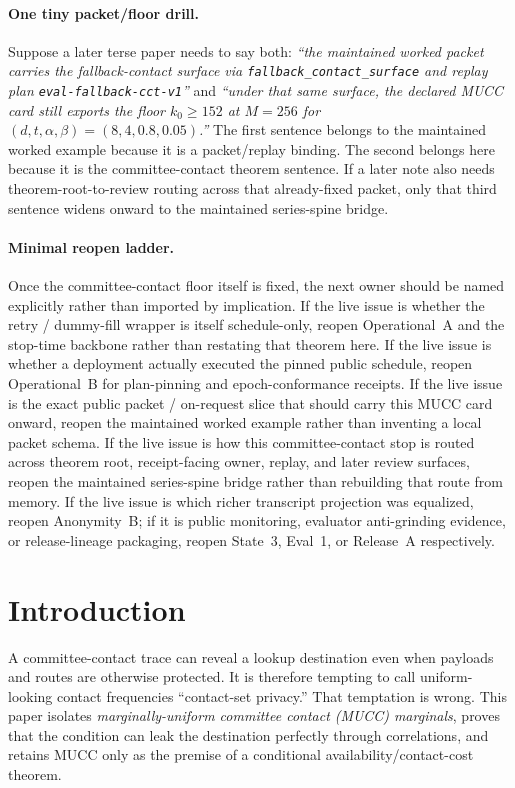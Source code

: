 \documentclass[11pt]{article}
\begin{document}
\paragraph{One tiny packet/floor drill.}
Suppose a later terse paper needs to say both: \emph{``the maintained worked packet carries the fallback-contact surface via \texttt{fallback\_contact\_surface} and replay plan \texttt{eval-fallback-cct-v1}''} and \emph{``under that same surface, the declared MUCC card still exports the floor $k_0\ge 152$ at $M=256$ for $(d,t,\alpha,\beta)=(8,4,0.8,0.05)$.''} The first sentence belongs to the maintained worked example because it is a packet/replay binding. The second belongs here because it is the committee-contact theorem sentence. If a later note also needs theorem-root-to-review routing across that already-fixed packet, only that third sentence widens onward to the maintained series-spine bridge.\cite{series:workedexample,series:seriesspines}

\paragraph{Minimal reopen ladder.}
Once the committee-contact floor itself is fixed, the next owner should be named explicitly rather than imported by implication.
If the live issue is whether the retry / dummy-fill wrapper is itself schedule-only, reopen Operational~A and the stop-time backbone rather than restating that theorem here.\cite{series:operationalA,series:stoptimeaddendum}
If the live issue is whether a deployment actually executed the pinned public schedule, reopen Operational~B for plan-pinning and epoch-conformance receipts.\cite{series:operationalB}
If the live issue is the exact public packet / on-request slice that should carry this MUCC card onward, reopen the maintained worked example rather than inventing a local packet schema.\cite{series:workedexample}
If the live issue is how this committee-contact stop is routed across theorem root, receipt-facing owner, replay, and later review surfaces, reopen the maintained series-spine bridge rather than rebuilding that route from memory.\cite{series:seriesspines}
If the live issue is which richer transcript projection was equalized, reopen Anonymity~B; if it is public monitoring, evaluator anti-grinding evidence, or release-lineage packaging, reopen State~3, Eval~1, or Release~A respectively.\cite{series:profiling,series:state3,series:evalnotary,series:release}

\section{Introduction}
A committee-contact trace can reveal a lookup destination even when payloads and routes are otherwise protected.  It is therefore tempting to call uniform-looking contact frequencies ``contact-set privacy.''  That temptation is wrong.  This paper isolates \emph{marginally-uniform committee contact (MUCC) marginals}, proves that the condition can leak the destination perfectly through correlations, and retains MUCC only as the premise of a conditional availability/contact-cost theorem.
\end{document}
